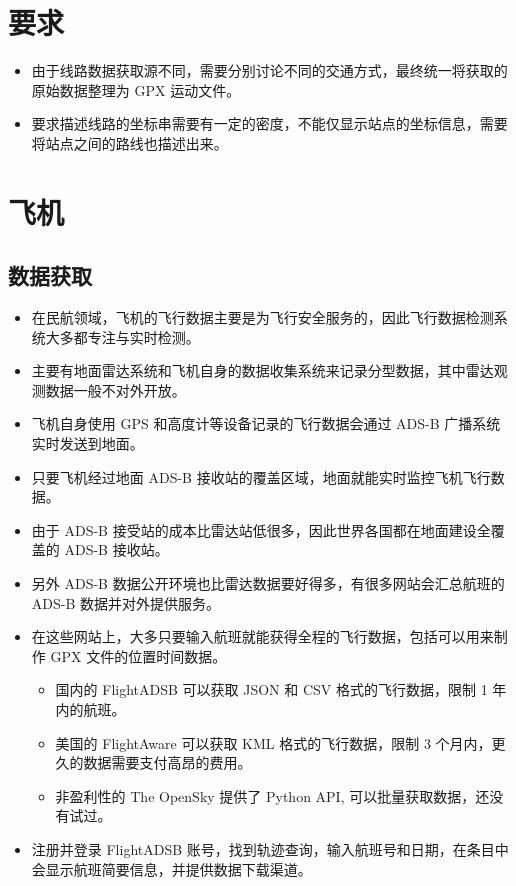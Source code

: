 \section{要求}
\begin{itemize}
	\item 由于线路数据获取源不同，需要分别讨论不同的交通方式，最终统一将获取的原始数据整理为 GPX 运动文件。
	\item 要求描述线路的坐标串需要有一定的密度，不能仅显示站点的坐标信息，需要将站点之间的路线也描述出来。
\end{itemize}


\section{飞机}
\subsection{数据获取}
\begin{itemize}
	\item 在民航领域，飞机的飞行数据主要是为飞行安全服务的，因此飞行数据检测系统大多都专注与实时检测。
	\item 主要有地面雷达系统和飞机自身的数据收集系统来记录分型数据，其中雷达观测数据一般不对外开放。
	\item 飞机自身使用 GPS 和高度计等设备记录的飞行数据会通过 ADS-B 广播系统实时发送到地面。
	\item 只要飞机经过地面 ADS-B 接收站的覆盖区域，地面就能实时监控飞机飞行数据。
	\item 由于 ADS-B 接受站的成本比雷达站低很多，因此世界各国都在地面建设全覆盖的 ADS-B 接收站。
	\item 另外 ADS-B 数据公开环境也比雷达数据要好得多，有很多网站会汇总航班的 ADS-B 数据并对外提供服务。
	\item 在这些网站上，大多只要输入航班就能获得全程的飞行数据，包括可以用来制作 GPX 文件的位置时间数据。
	\begin{itemize}
		\item 国内的 FlightADSB 可以获取 JSON 和 CSV 格式的飞行数据，限制 1 年内的航班。
		\item 美国的 FlightAware 可以获取 KML 格式的飞行数据，限制 3 个月内，更久的数据需要支付高昂的费用。
		\item 非盈利性的 The OpenSky 提供了 Python API, 可以批量获取数据，还没有试过。
	\end{itemize}
	\item 注册并登录 FlightADSB 账号，找到轨迹查询，输入航班号和日期，在条目中会显示航班简要信息，并提供数据下载渠道。
\end{itemize}


